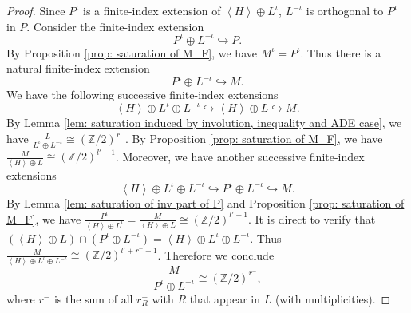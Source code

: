 \documentclass[12pt,reqno,a4paper]{amsart}
\theoremstyle{remark}
\theoremstyle{definition}
\newcommand{\ZZ}{\mathbb{Z}}
\begin{document}
\begin{proof}
    Since $P^{\iota}$ is a finite-index extension of $\left\langle H\right\rangle\oplus L^{\iota}$, $L^{-\iota}$ is orthogonal to $P^{\iota}$ in $P$.
    Consider the finite-index extension
    \begin{equation*}
        P^{\iota}\oplus L^{-\iota}\hookrightarrow P.
    \end{equation*}
    By Proposition \ref{prop: saturation of M_F}, we have $M^{\iota} = P^{\iota}$.
    Thus there is a natural finite-index extension 
    \begin{equation*}
        P^{\iota}\oplus L^{-\iota} \hookrightarrow M.
    \end{equation*}
    We have the following successive finite-index extensions
    \begin{equation*}
        \left\langle H \right\rangle \oplus L^{\iota} \oplus L^{-\iota} \hookrightarrow \left\langle H \right\rangle \oplus L \hookrightarrow M.
    \end{equation*}
    By Lemma \ref{lem: saturation induced by involution, inequality and ADE case}, we have $\frac{L}{L^{\iota} \oplus L^{-\iota}} \cong (\ZZ/2)^{r^-}$.
    By Proposition \ref{prop: saturation of M_F}, we have $\frac{M}{\left\langle H\right\rangle \oplus L}\cong (\ZZ/2)^{l'-1}$.
    Moreover, we have another successive finite-index extensions 
    \begin{equation*}
        \left\langle H \right\rangle \oplus L^{\iota} \oplus L^{-\iota} \hookrightarrow P^{\iota}\oplus L^{-\iota} \hookrightarrow M.
    \end{equation*}
    By Lemma \ref{lem: saturation of inv part of P} and Proposition \ref{prop: saturation of M_F}, we have $\frac{P^{\iota}}{\left\langle H \right\rangle \oplus L^{\iota}} = \frac{M}{\left\langle H \right\rangle \oplus L} \cong (\ZZ/2)^{l'-1}$.
    It is direct to verify that $(\left\langle H \right\rangle \oplus L)\cap (P^{\iota}\oplus L^{-\iota}) = \left\langle H \right\rangle \oplus L^\iota \oplus L^{-\iota}$.
    Thus $\frac{M}{\left\langle H \right\rangle \oplus L^\iota \oplus L^{-\iota}} \cong (\ZZ/2)^{l'+r^--1}$.
    Therefore we conclude
    \begin{equation*}
    \label{eqn: saturation of M over P^iota oplus L^-iota}
        \frac{M}{P^{\iota}\oplus L^{-\iota}}\cong (\ZZ/2)^{r^-},
    \end{equation*}
    where $r^-$ is the sum of all $r_R^-$ with $R$ that appear in $L$ (with multiplicities).


\end{proof}
\end{document}

